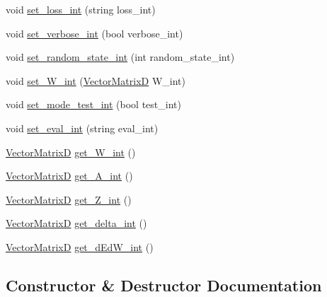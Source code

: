 \begin{DoxyCompactItemize}
\item 
void \hyperlink{classneural__network_1_1nnet__int_a0494cbc029a4b92d9652767e34a39ee3}{set\+\_\+loss\+\_\+int} (string loss\+\_\+int)
\item 
void \hyperlink{classneural__network_1_1nnet__int_a3164f2d824ca39a9500841a5479d36a7}{set\+\_\+verbose\+\_\+int} (bool verbose\+\_\+int)
\item 
void \hyperlink{classneural__network_1_1nnet__int_a9c4411a301b7436de67843e5ee7950e4}{set\+\_\+random\+\_\+state\+\_\+int} (int random\+\_\+state\+\_\+int)
\item 
void \hyperlink{classneural__network_1_1nnet__int_aa2cfddbe66f97bcade94ef07498df396}{set\+\_\+\+W\+\_\+int} (\hyperlink{nnet__interface_8h_afe2cedbb44cc7edea19f72621f8e8e0e}{Vector\+Matrix\+D} W\+\_\+int)
\item 
void \hyperlink{classneural__network_1_1nnet__int_a8ac1cfa0643c628a90f42d8c0e2bdc42}{set\+\_\+mode\+\_\+test\+\_\+int} (bool test\+\_\+int)
\item 
void \hyperlink{classneural__network_1_1nnet__int_ab14d89d848a4e1dd94a1a6c13efbeaf9}{set\+\_\+eval\+\_\+int} (string eval\+\_\+int)
\item 
\hyperlink{nnet__interface_8h_afe2cedbb44cc7edea19f72621f8e8e0e}{Vector\+Matrix\+D} \hyperlink{classneural__network_1_1nnet__int_a6943c7806d6cdc9b41617b22970a15a6}{get\+\_\+\+W\+\_\+int} ()
\item 
\hyperlink{nnet__interface_8h_afe2cedbb44cc7edea19f72621f8e8e0e}{Vector\+Matrix\+D} \hyperlink{classneural__network_1_1nnet__int_ae9bce7090a8fc5cb93d8e994e6127574}{get\+\_\+\+A\+\_\+int} ()
\item 
\hyperlink{nnet__interface_8h_afe2cedbb44cc7edea19f72621f8e8e0e}{Vector\+Matrix\+D} \hyperlink{classneural__network_1_1nnet__int_aa407a2b1602c518a0d2ff4de9e008a31}{get\+\_\+\+Z\+\_\+int} ()
\item 
\hyperlink{nnet__interface_8h_afe2cedbb44cc7edea19f72621f8e8e0e}{Vector\+Matrix\+D} \hyperlink{classneural__network_1_1nnet__int_abb74139494750b28b1393f463f7808ab}{get\+\_\+delta\+\_\+int} ()
\item 
\hyperlink{nnet__interface_8h_afe2cedbb44cc7edea19f72621f8e8e0e}{Vector\+Matrix\+D} \hyperlink{classneural__network_1_1nnet__int_aa890ec09da4baa9cf5d22fdf6baf76d6}{get\+\_\+d\+Ed\+W\+\_\+int} ()
\end{DoxyCompactItemize}


\subsection{Constructor \& Destructor Documentation}
\hypertarget{classneural__network_1_1nnet__int_ac08ffc21bf083695f5aeb8a5f13b1994}{}
